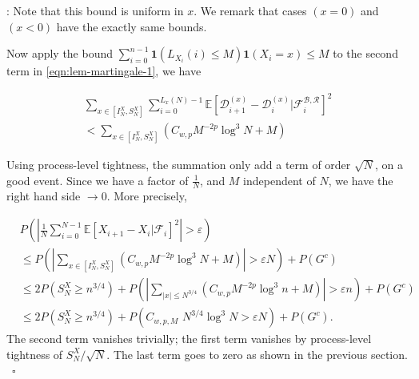 \documentclass[twoside,12pt,a4paper]{article}
\numberwithin{equation}{section}
\newenvironment{proof}[1][Proof]{{\sc #1}:}{~\hfill $\square$}
\begin{document}
\begin{proof}[Proof of Proposition~\ref{lm: control of martingale}]
Note that this bound is uniform in $x$. We remark that cases $(x=0)$ and $(x < 0)$ have the exactly same bounds. 

Now apply the bound $\sum_{i = 0}^{n-1} \mathbf{1}\left( L_{X_i}(i) \le M \right) \mathbf{1}(X_i = x) \le  M$ to the second term in \eqref{eqn:lem-martingale-1}, we have

\begin{multline}
	\sum_{x \in \left[ I_N^X, S_N^X \right]} \sum_{i = 0}^{L_x(N) - 1} \mathbb{E}\left[ \mathcal{D}_{i+1}^{(x)} - \mathcal{D}_i^{(x)} | \mathcal{F}_{i}^{\mathcal{B}, \mathcal{R}} \right]^2 \\
	< \sum_{x \in \left[ I_N^X, S_N^X \right]} (C_{w, p} M^{-2p} \log^3 N +M )
\end{multline}

Using process-level tightness, the summation only add a term of order $\sqrt{N}$, on a good event. Since we have a factor of $\frac{1}{N}$, and $M$ independent of $N$, we have the right hand side $\to 0$. More precisely,

\begin{align*}
	 &P\left( \left| \frac{1}{N} \sum_{i = 0}^{N-1} \mathbb{E}\left[ X_{i+1} - X_i | \mathcal{F}_i \right]^2  \right|  > \varepsilon \right)\\
	 &\le P\left( \left| \sum_{x \in \left[ I_N^X, S_N^X \right]} (C_{w, p} M^{-2p} \log^3 N +M ) \right| > \varepsilon  N \right) + P(G^c) \\
	 &\le 2 P\left( S_N^X \ge n^{3 / 4} \right) + P\left(  \left| \sum_{|x| \le N^{3 / 4}} (C_{w, p} M^{-2p} \log^3 n +M ) \right| > \varepsilon  n  \right) +P(G^c)  \\
	 &\le 2 P\left( S_N^X \ge n^{3 / 4} \right) + P\left(  C_{w, p, M} \,\, N^{3 / 4} \log^3 N > \varepsilon  N  \right) + P(G^c)
.\end{align*}
The second term vanishes trivially; the first term vanishes by process-level tightness of $S_N^X / \sqrt{N} $. The last term goes to zero as shown in the previous section.
\end{proof}

\printbibliography
\end{document}
